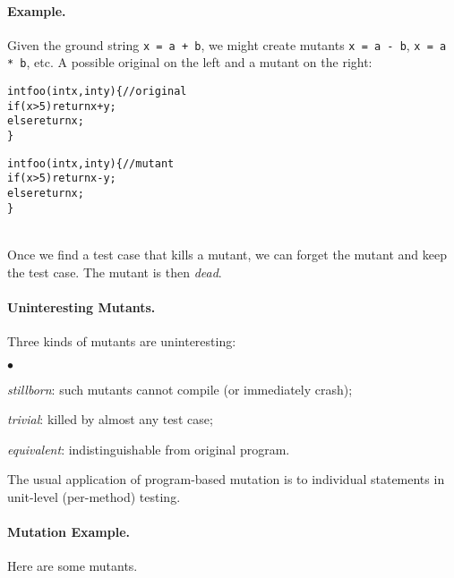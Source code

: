 \documentclass[11pt]{article}
\newcommand{\squishlist}{
 \begin{list}{$\bullet$}
  { \setlength{\itemsep}{0pt}
     \setlength{\parsep}{3pt}
     \setlength{\topsep}{3pt}
     \setlength{\partopsep}{0pt}
     \setlength{\leftmargin}{1.5em}
     \setlength{\labelwidth}{1em}
     \setlength{\labelsep}{0.5em} } }
\newcommand{\squishend}{
  \end{list}  }
\begin{document}
\paragraph{Example.} Given the ground string {\tt x = a + b},
we might create mutants {\tt x = a - b}, {\tt x = a * b}, etc.
A possible original on the
left and a mutant on the right:

\begin{minipage}{.5\textwidth} 
\begin{alltt}
int foo(int x, int y) \{ // original
  if (x > 5) return x + y;
  else return x;
\}
\end{alltt}
\end{minipage}\begin{minipage}{.5\textwidth}
\begin{alltt}
int foo(int x, int y) \{ // mutant
  if (x > 5) return x - y;
  else return x;
\}
\end{alltt}
\end{minipage}
~\\[3em]

Once we find a test case that kills a mutant, we can forget the
mutant and keep the test case. The mutant is then \emph{dead}.

\paragraph{Uninteresting Mutants.} Three kinds of mutants are uninteresting:
\squishlist
\item \emph{stillborn}: such mutants cannot compile (or immediately crash);
\item \emph{trivial}: killed by almost any test case;
\item \emph{equivalent}: indistinguishable from original program.
\squishend

The usual application of program-based mutation is to individual statements
in unit-level (per-method) testing.

\paragraph{Mutation Example.} Here are some mutants.
\end{document}
